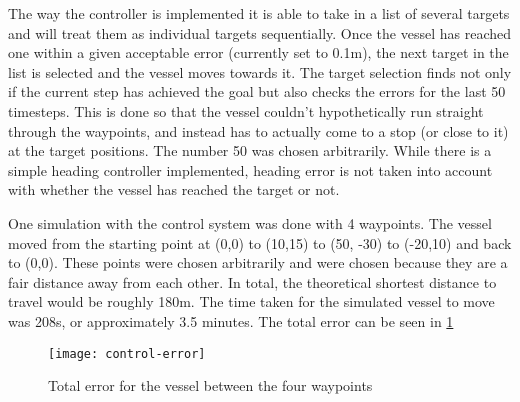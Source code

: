 The way the controller is implemented it is able to take in a list of several targets and will treat them as individual targets sequentially. Once the vessel has reached one within a given acceptable error (currently set to 0.1m), the next target in the list is selected and the vessel moves towards it. The target selection finds not only if the current step has achieved the goal but also checks the errors for the last 50 timesteps. This is done so that the vessel couldn't hypothetically run straight through the waypoints, and instead has to actually come to a stop (or close to it) at the target positions. The number 50 was chosen arbitrarily. While there is a simple heading controller implemented, heading error is not taken into account with whether the vessel has reached the target or not. 

One simulation with the control system was done with 4 waypoints. The vessel moved from the starting point at (0,0) to (10,15) to (50, -30) to (-20,10) and back to (0,0). These points were chosen arbitrarily and were chosen because they are a fair distance away from each other. In total, the theoretical shortest distance to travel would be roughly 180m. The time taken for the simulated vessel to move was 208s, or approximately 3.5 minutes. The total error can be seen in \cref{fig:error}

\begin{figure}
	\centering
	\texttt{[image: control-error]}
	\caption{Total error for the vessel between the four waypoints}
	\label{fig:error}
\end{figure}
